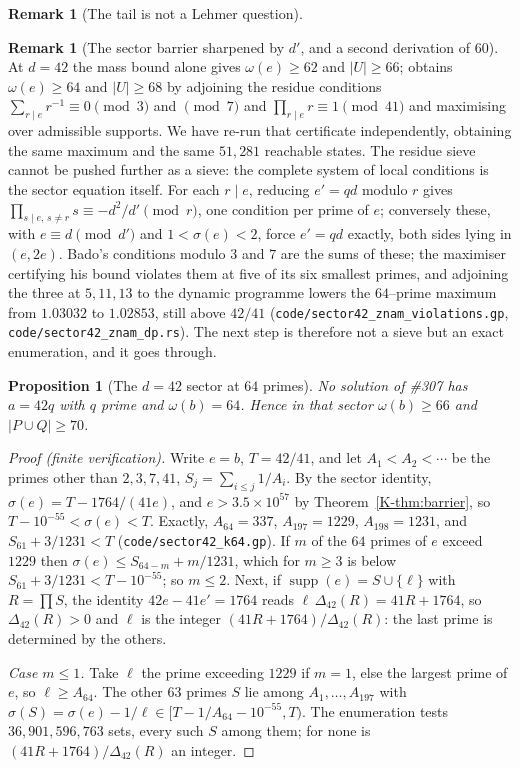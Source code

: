 \documentclass[11pt]{article}
\newtheorem{proposition}[theorem]{Proposition}
\theoremstyle{definition}
\newtheorem{remark}[theorem]{Remark}
\begin{document}
\begin{remark}[The tail is not a Lehmer question]
\begin{remark}[The sector barrier sharpened by $d'$, and a second derivation of $60$]
At $d=42$ the mass bound alone gives $\omega(e)\ge62$ and $|U|\ge66$; \cite{Bado2026b} obtains
$\omega(e)\ge64$ and $|U|\ge68$ by adjoining the residue conditions
$\sum_{r\mid e}r^{-1}\equiv0\pmod 3$ and $\pmod 7$ and $\prod_{r\mid e}r\equiv1\pmod{41}$ and
maximising over admissible supports. We have re-run that certificate independently, obtaining the
same maximum and the same $51{,}281$ reachable states. The residue sieve cannot be pushed further as
a sieve: the complete system of local conditions is the sector equation itself. For each $r\mid e$,
reducing $e'=qd$ modulo $r$ gives $\prod_{s\mid e,\,s\ne r}s\equiv-d^2/d'\pmod r$, one condition
per prime of $e$; conversely these, with $e\equiv d\pmod{d'}$ and $1<\sigma(e)<2$, force $e'=qd$
exactly, both sides lying in $(e,2e)$. Bado's conditions modulo $3$ and $7$ are the sums of these;
the maximiser certifying his bound violates them at five of its six smallest primes, and adjoining
the three at $5,11,13$ to the dynamic programme lowers the $64$--prime maximum from $1.03032$ to
$1.02853$, still above $42/41$ \textup{(\texttt{code/sector42\_znam\_violations.gp},
\texttt{code/sector42\_znam\_dp.rs})}. The next step is therefore not a sieve but an exact
enumeration, and it goes through.
\end{remark}

\begin{proposition}[The $d=42$ sector at $64$ primes]\label{prop:sector42}
No solution of \#307 has $a=42q$ with $q$ prime and $\omega(b)=64$. Hence in that sector
$\omega(b)\ge66$ and $|P\cup Q|\ge70$.
\end{proposition}

\begin{proof}[Proof (finite verification)]
Write $e=b$, $T=42/41$, and let $A_1<A_2<\cdots$ be the primes other than $2,3,7,41$, $S_j=\sum_{i\le j}1/A_i$.
By the sector identity, $\sigma(e)=T-1764/(41e)$, and $e>3.5\times10^{57}$ by Theorem~\ref{K-thm:barrier},
so $T-10^{-55}<\sigma(e)<T$. Exactly, $A_{64}=337$, $A_{197}=1229$, $A_{198}=1231$, and
$S_{61}+3/1231<T$ \textup{(\texttt{code/sector42\_k64.gp})}. If $m$ of the $64$ primes of $e$ exceed
$1229$ then $\sigma(e)\le S_{64-m}+m/1231$, which for $m\ge3$ is below $S_{61}+3/1231<T-10^{-55}$; so
$m\le2$. Next, if $\operatorname{supp}(e)=S\cup\{\ell\}$ with $R=\prod S$, the identity
$42e-41e'=1764$ reads $\ell\,\Delta_{42}(R)=41R+1764$, so $\Delta_{42}(R)>0$ and $\ell$ is the integer
$(41R+1764)/\Delta_{42}(R)$: the last prime is determined by the others.

\emph{Case $m\le1$.} Take $\ell$ the prime exceeding $1229$ if $m=1$, else the largest prime of $e$, so
$\ell\ge A_{64}$. The other $63$ primes $S$ lie among $A_1,\dots,A_{197}$ with
$\sigma(S)=\sigma(e)-1/\ell\in[T-1/A_{64}-10^{-55},T)$. The enumeration tests $36{,}901{,}596{,}763$ sets, every
such $S$ among them; for none is $(41R+1764)/\Delta_{42}(R)$ an integer.


\end{proof}
\end{remark}
\end{document}
